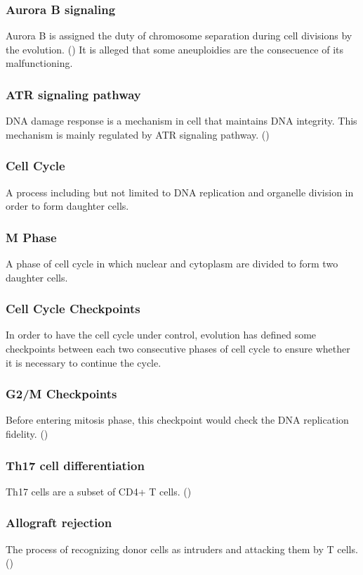 \documentclass[3p,authoryear,preprint,12pt]{elsarticle}
\begin{document}
\subsubsection{Aurora B signaling}
Aurora B is assigned the duty of chromosome separation during cell divisions by the evolution. (\cite{Krenn2015})
It is alleged that some aneuploidies are the consecuence of its malfunctioning.

\subsubsection{ATR signaling pathway}
DNA damage response is a mechanism in cell that maintains DNA integrity. This mechanism is mainly regulated by ATR signaling pathway. (\cite{Nam2011})

\subsubsection{Cell Cycle}
A process including but not limited to DNA replication and organelle division in order to form daughter cells.

\subsubsection{M Phase}
A phase of cell cycle in which nuclear and cytoplasm are divided to form two daughter cells.

\subsubsection{Cell Cycle Checkpoints}
In order to have the cell cycle under control, evolution has defined some checkpoints between each two consecutive phases of cell cycle to ensure whether it is necessary to continue the cycle.

\subsubsection{G2/M Checkpoints}
Before entering mitosis phase, this checkpoint would check the DNA replication fidelity. (\cite{Stark2004}) 

\subsubsection{Th17 cell differentiation}
Th17 cells are a subset of CD4+ T cells. (\cite{KEGG ThCD})

\subsubsection{Allograft rejection}
The process of recognizing donor cells as intruders and attacking them by T cells. (\cite{Martinu2011})
\end{document}
